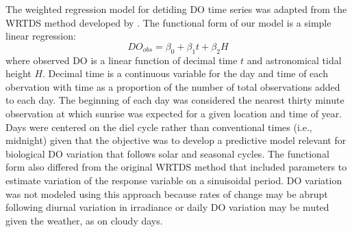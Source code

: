 \documentclass[letterpaper,12pt,oneside]{article}\usepackage[]{graphicx}\usepackage[]{color}
\begin{document}
The weighted regression model for detiding \ac{DO} time series was adapted from the \ac{WRTDS} method developed by \citet{Hirsch10}.  The functional form of our model is a simple linear regression:
\begin{equation}\label{funform}
DO_{obs}= \beta_0 + \beta_1 t + \beta_2 H
\end{equation}
where observed \ac{DO} is a linear function of decimal time $t$ and astronomical tidal height $H$. Decimal time is a continuous variable for the day and time of each obervation with time as a proportion of the number of total observations added to each day.  The beginning of each day was considered the nearest thirty minute observation at which sunrise was expected for a given location and time of year.  Days were centered on the diel cycle rather than conventional times (i.e., midnight) given that the objective was to develop a predictive model relevant for biological \ac{DO} variation that follows solar and seasonal cycles.  The functional form also differed from the original \ac{WRTDS} method that included parameters to estimate variation of the response variable on a sinuisoidal period.  \ac{DO} variation was not modeled using this approach because rates of change may be abrupt following diurnal variation in irradiance or daily \ac{DO} variation may be muted given the weather, as on cloudy days.
\end{document}
